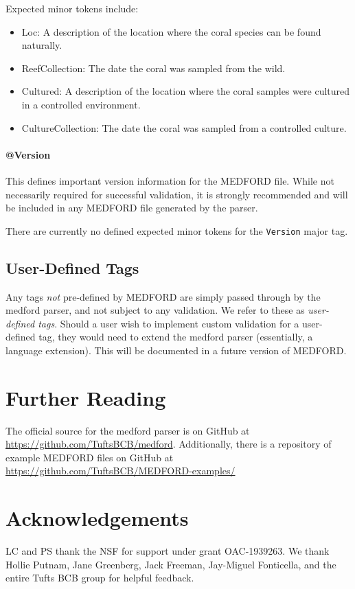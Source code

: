 \documentclass[10pt]{article}
\begin{document}
    Expected minor tokens include:
    \begin{itemize}
        \item Loc: A description of the location where the coral species can be found naturally.
        \item ReefCollection: The date the coral was sampled from the wild.
        \item Cultured: A description of the location where the coral samples were cultured in a controlled environment.
        \item CultureCollection: The date the coral was sampled from a controlled culture.
    \end{itemize}
    
    \paragraph{@Version}
    
    This defines important version information for the MEDFORD file. While not necessarily required for successful validation, it is strongly recommended and will be included in any MEDFORD file generated by the parser.
    
    There are currently no defined expected minor tokens for the \texttt{Version} major tag.
    


\subsection{User-Defined Tags}\label{user-defined}

Any tags \emph{not} pre-defined by MEDFORD are simply passed through by the medford parser, and not subject to any validation. We refer to these as \emph{user-defined tags}. Should a user wish to implement custom validation for a user-defined tag, they would need to extend the medford parser (essentially, a language extension). This will be documented in a future version of MEDFORD.

\section{Further Reading}{
    The official source for the medford parser is on GitHub at \url{https://github.com/TuftsBCB/medford}.
    Additionally, there is a repository of example MEDFORD files on GitHub at \url{https://github.com/TuftsBCB/MEDFORD-examples/}
}

\section{Acknowledgements}{LC and PS thank the NSF for support under grant OAC-1939263. We thank Hollie Putnam, Jane Greenberg, Jack Freeman, Jay-Miguel Fonticella, and the entire Tufts BCB group for helpful feedback.}
\end{document}
